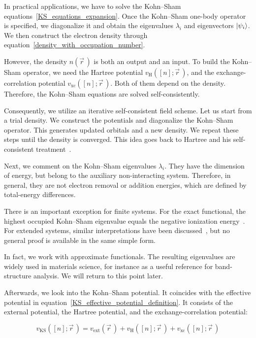In practical applications, we have to solve the Kohn--Sham equations~\eqref{KS_equations_expansion}.
Once the Kohn--Sham one-body operator is specified,
we diagonalize it and obtain the eigenvalues $\lambda_i$ and eigenvectors $\ket{\psi_i}$.
We then construct the electron density through equation~\eqref{density_with_occupation_number}.

However, the density $n(\vec{r}\,)$ is both an output and an input.
To build the Kohn--Sham operator, we need the Hartree potential $v_\mathrm{H}([n];\vec{r}\,)$,
and the exchange-correlation potential $v_\mathrm{xc}([n];\vec{r}\,)$.
Both of them depend on the density.
Therefore, the Kohn--Sham equations are solved self-consistently.

Consequently, we utilize an iterative self-consistent field scheme.
Let us start from a trial density.
We construct the potentials and diagonalize the Kohn--Sham operator.
This generates updated orbitals and a new density.
We repeat these steps until the density is converged.
This idea goes back to Hartree and his self-consistent treatment~\cite{hartree1928wave}.

Next, we comment on the Kohn--Sham eigenvalues $\lambda_i$.
They have the dimension of energy,
but belong to the auxiliary non-interacting system.
Therefore, in general, they are not electron removal or addition energies,
which are defined by total-energy differences.

There is an important exception for finite systems.
For the exact functional, the highest occupied Kohn--Sham eigenvalue equals the negative ionization energy~\cite{perdew1997comment, harbola1999relationship}.
For extended systems, similar interpretations have been discussed~\cite{mundt2006photoelectron},
but no general proof is available in the same simple form.

In fact, we work with approximate functionals.
The resulting eigenvalues are widely used in materials science, for instance as a useful reference for band-structure analysis.
We will return to this point later.

Afterwards, we look into the Kohn--Sham potential.
It coincides with the effective potential in equation~\eqref{KS_effective_potential_definition}.
It consists of the external potential, the Hartree potential, and the exchange-correlation potential:

\begin{equation}
    v_\mathrm{KS}([n];\vec{r}\,)
    = v_\mathrm{ext}(\vec{r}\,)
    + v_\mathrm{H}([n];\vec{r}\,)
    + v_\mathrm{xc}([n];\vec{r}\,)
\label{KS_potential_decomposition}
\end{equation}


